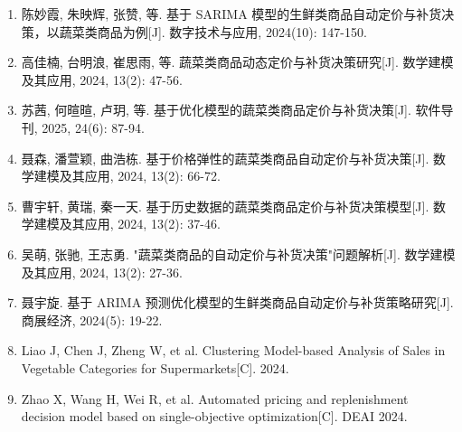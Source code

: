 \begin{enumerate}
\item 陈妙霞, 朱映辉, 张赞, 等. 基于 SARIMA 模型的生鲜类商品自动定价与补货决策，以蔬菜类商品为例[J]. 数字技术与应用, 2024(10): 147-150.
\item 高佳楠, 台明浪, 崔思雨, 等. 蔬菜类商品动态定价与补货决策研究[J]. 数学建模及其应用, 2024, 13(2): 47-56.
\item 苏茜, 何暄暄, 卢玥, 等. 基于优化模型的蔬菜类商品定价与补货决策[J]. 软件导刊, 2025, 24(6): 87-94.
\item 聂森, 潘萱颖, 曲浩栋. 基于价格弹性的蔬菜类商品自动定价与补货决策[J]. 数学建模及其应用, 2024, 13(2): 66-72.
\item 曹宇轩, 黄瑞, 秦一天. 基于历史数据的蔬菜类商品定价与补货决策模型[J]. 数学建模及其应用, 2024, 13(2): 37-46.
\item 吴萌, 张驰, 王志勇. "蔬菜类商品的自动定价与补货决策"问题解析[J]. 数学建模及其应用, 2024, 13(2): 27-36.
\item 聂宇旋. 基于 ARIMA 预测优化模型的生鲜类商品自动定价与补货策略研究[J]. 商展经济, 2024(5): 19-22.
\item Liao J, Chen J, Zheng W, et al. Clustering Model-based Analysis of Sales in Vegetable Categories for Supermarkets[C]. 2024.
\item Zhao X, Wang H, Wei R, et al. Automated pricing and replenishment decision model based on single-objective optimization[C]. DEAI 2024.
\end{enumerate}
